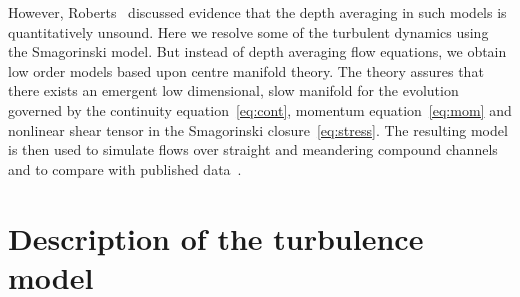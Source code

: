 \documentclass[a5paper,12pt]{article}
\begin{document}
However, Roberts~\cite{Roberts1996} discussed evidence that the depth averaging in such models is quantitatively unsound.
Here we resolve some of the turbulent dynamics using the Smagorinski model.
But instead of depth averaging flow equations, we obtain low order models based upon centre manifold theory. 
The theory assures that there exists an emergent low dimensional, slow manifold for the evolution governed by the continuity equation~\eqref{eq:cont}, momentum equation~\eqref{eq:mom} and nonlinear shear tensor in the Smagorinski closure~\eqref{eq:stress}.
The resulting model is then used to simulate flows over straight and meandering compound channels and to compare with published data~\cite[e.g.]{Bousmar2002, Liu2009}.


\section{Description of the turbulence model}
\end{document}
